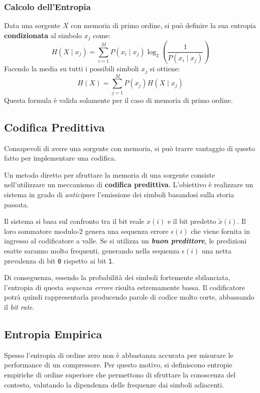 \subsubsection{Calcolo dell'Entropia}
Data una sorgente $X$ con memoria di primo ordine, si può definire la sua entropia \textbf{condizionata} al simbolo $x_j$ come:
\[H(X \mid x_j) = \sum_{i=1}^M P(x_i \mid x_j)\log_2\left(\frac{1}{P(x_i \mid x_j)}\right)\]
Facendo la media su tutti i possibili simboli $x_j$ si ottiene:
\[H(X) = \sum_{j=1}^M P(x_j)H(X \mid x_j)\]
Questa formula è valida solamente per il caso di memoria di primo ordine.

\subsection{Codifica Predittiva}
Consapevoli di avere una sorgente con memoria, si può trarre vantaggio di questo fatto per implementare una codifica.

Un metodo diretto per sfruttare la memoria di una sorgente consiste nell'utilizzare un meccanismo di \textbf{codifica predittiva}. L'obiettivo è realizzare un sistema in grado di \textit{anticipare} l'emissione dei simboli basandosi sulla storia passata.

Il sistema si basa sul confronto tra il bit reale $x(i)$ e il bit predetto $\tilde{x}(i)$. Il loro sommatore modulo-2 genera una sequenza errore $\epsilon(i)$ che viene fornita in ingresso al codificatore a valle. 
Se si utilizza un \textbf{\textit{buon predittore}}, le predizioni esatte saranno molto frequenti, generando nella sequenza $\epsilon(i)$ una netta prevalenza di bit \texttt{0} rispetto ai bit \texttt{1}.

Di conseguenza, essendo la probabilità dei simboli fortemente sbilanciata, l'entropia di questa \textit{sequenza errore} risulta estremamente bassa. Il codificatore potrà quindi rappresentarla producendo parole di codice molto corte, abbassando il \textit{bit rate}.


\subsection{Entropia Empirica}
Spesso l'entropia di ordine zero non è abbastanza accurata per misurare le performance di un compressore. Per questo motivo, si definiscono entropie empiriche di ordine superiore che permettono di sfruttare la conoscenza del contesto, valutando la dipendenza delle frequenze dai simboli adiacenti.

